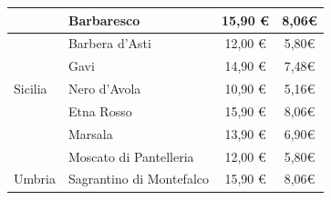\documentclass[12pt, a4paper]{article}
\begin{document}
\begin{longtable}{@{}|l|l|c|c|}
                         & Barbaresco                                                                & 15,90 €                                                         & 8,06€                                                                                                         \\ \hline
                         & Barbera d'Asti                                                            & 12,00 €                                                         & 5,80€                                                                                                         \\ \hline
                         & Gavi                                                                      & 14,90 €                                                         & 7,48€                                                                                                         \\ \hline
    Sicilia              & Nero d'Avola                                                              & 10,90 €                                                         & 5,16€                                                                                                         \\ \hline
                         & Etna Rosso                                                                & 15,90 €                                                         & 8,06€                                                                                                         \\ \hline
                         & Marsala                                                                   & 13,90 €                                                         & 6,90€                                                                                                         \\ \hline
                         & Moscato di Pantelleria                                                    & 12,00 €                                                         & 5,80€                                                                                                         \\ \hline
    Umbria               & Sagrantino di Montefalco                                                  & 15,90 €                                                         & 8,06€                                                                                                         \\ \hline

\end{longtable}
\end{document}

